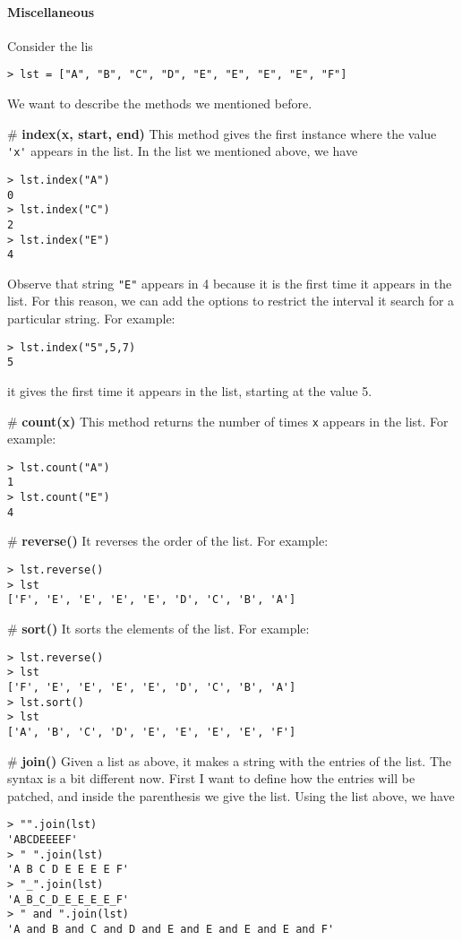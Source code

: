 \paragraph{Miscellaneous}

Consider the lis
\begin{verbatim}
> lst = ["A", "B", "C", "D", "E", "E", "E", "E", "F"]
\end{verbatim}

We want to describe the methods we mentioned before. 

\# {\bf index(x, start, end)} This method gives the first instance where the value \verb|'x'| appears in the list. In the list we mentioned above, we have
\begin{verbatim}
> lst.index("A")
0
> lst.index("C")
2
> lst.index("E")
4
\end{verbatim}
Observe that string \verb|"E"| appears in 4 because it is the first time it appears in the list. For this reason, we can add the options to restrict the interval it search for a particular string. For example:
\begin{verbatim}
> lst.index("5",5,7)
5
\end{verbatim}
it gives the first time it appears in the list, starting at the value 5.

\# {\bf count(x)} This method returns the number of times \verb|x| appears in the list. For example:
\begin{verbatim}
> lst.count("A")
1
> lst.count("E")
4
\end{verbatim}
    
\# {\bf reverse()} It reverses the order of the list. For example:
\begin{verbatim}
> lst.reverse()
> lst
['F', 'E', 'E', 'E', 'E', 'D', 'C', 'B', 'A']
\end{verbatim}

\# {\bf sort()} It sorts the elements of the list. For example:
\begin{verbatim}
> lst.reverse()
> lst
['F', 'E', 'E', 'E', 'E', 'D', 'C', 'B', 'A'] 
> lst.sort()
> lst
['A', 'B', 'C', 'D', 'E', 'E', 'E', 'E', 'F']     
\end{verbatim}

\# {\bf join()}
Given a list as above, it makes a string with the entries of the list. The syntax is a bit different now. First I want to define how the entries will be patched, and inside the parenthesis we give the list. Using the list above, we have 
\begin{verbatim}
> "".join(lst)
'ABCDEEEEF'
> " ".join(lst)
'A B C D E E E E F'
> "_".join(lst)
'A_B_C_D_E_E_E_E_F'
> " and ".join(lst)
'A and B and C and D and E and E and E and E and F'
\end{verbatim}        

